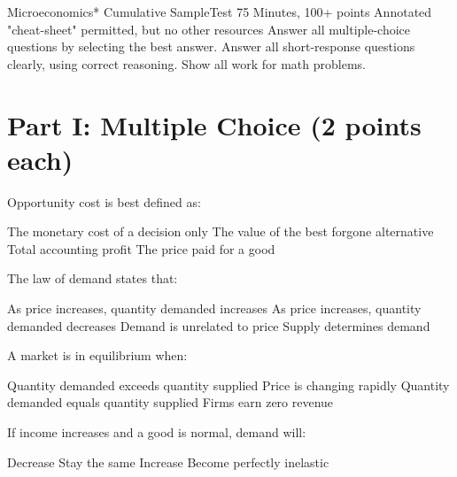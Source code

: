 \documentclass[12pt]{exam}
\begin{document}
\FontEasyRead

\Heading
{Microeconomics*}
{Cumulative SampleTest}
{75 Minutes, 100+ points
    Annotated "cheat-sheet" permitted, but no other resources
    Answer all multiple-choice questions by selecting the best answer.
    Answer all short-response questions clearly, using correct reasoning.
    Show all work for math problems.}

\section*{Part I: Multiple Choice (2 points each)}

\begin{questions}

    \begin{mcquestion}[2]
        Opportunity cost is best defined as:
        \begin{choices}
            \choice The monetary cost of a decision only
            \CorrectChoice The value of the best forgone alternative
            \choice Total accounting profit
            \choice The price paid for a good
        \end{choices}
    \end{mcquestion}

    \begin{mcquestion}[2]
        The law of demand states that:
        \begin{choices}
            \choice As price increases, quantity demanded increases
            \CorrectChoice As price increases, quantity demanded decreases
            \choice Demand is unrelated to price
            \choice Supply determines demand
        \end{choices}
    \end{mcquestion}

    \begin{mcquestion}[2]
        A market is in equilibrium when:
        \begin{choices}
            \choice Quantity demanded exceeds quantity supplied
            \choice Price is changing rapidly
            \CorrectChoice Quantity demanded equals quantity supplied
            \choice Firms earn zero revenue
        \end{choices}
    \end{mcquestion}

    \begin{mcquestion}[2]
        If income increases and a good is normal, demand will:
        \begin{choices}
            \choice Decrease
            \choice Stay the same
            \CorrectChoice Increase
            \choice Become perfectly inelastic
        \end{choices}
    \end{mcquestion}


\end{questions}
\end{document}
